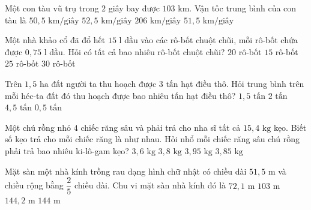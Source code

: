 \begin{ex} %
Một con tàu vũ trụ trong $2$ giây bay được $103\text{ km}$. Vận tốc trung bình của con tàu là
\choice
{$50{,}5\text{ km/giây}$}
{$52{,}5\text{ km/giây}$}
{$206\text{ km/giây}$}
{\True $51{,}5\text{ km/giây}$}
\end{ex}

\begin{ex} %
Một nhà khảo cổ đã đổ hết $15\text{ l}$ dầu vào các rô-bốt chuột chũi, mỗi rô-bốt chứa được $0{,}75\text{ l}$ dầu. Hỏi có tất cả bao nhiêu rô-bốt chuột chũi?
\choice
{\True $20$ rô-bốt}
{$15$ rô-bốt}
{$25$ rô-bốt}
{$30$ rô-bốt}
\end{ex}

\begin{ex} %
Trên $1{,}5\text{ ha}$ đất người ta thu hoạch được $3\text{ tấn}$ hạt điều thô. Hỏi trung bình trên mỗi héc-ta đất đó thu hoạch được bao nhiêu tấn hạt điều thô?
\choice
{$1{,}5\text{ tấn}$}
{\True $2\text{ tấn}$}
{$4{,}5\text{ tấn}$}
{$0{,}5\text{ tấn}$}
\end{ex}

\begin{ex} %
Một chú rồng nhỏ $4$ chiếc răng sâu và phải trả cho nha sĩ tất cả $15{,}4\text{ kg}$ kẹo. Biết số kẹo trả cho mỗi chiếc răng là như nhau. Hỏi nhổ mỗi chiếc răng sâu chú rồng phải trả bao nhiêu ki-lô-gam kẹo?
\choice
{$3{,}6\text{ kg}$}
{$3{,}8\text{ kg}$}
{$3{,}95\text{ kg}$}
{\True $3{,}85\text{ kg}$}
\end{ex}

\begin{ex} %
Mặt sàn một nhà kính trồng rau dạng hình chữ nhật có chiều dài $51{,}5\text{ m}$ và chiều rộng bằng $\dfrac{2}{5}$ chiều dài. Chu vi mặt sàn nhà kính đó là
\choice
{$72{,}1\text{ m}$}
{$103\text{ m}$}
{\True $144{,}2\text{ m}$}
{$144\text{ m}$}
\end{ex}

